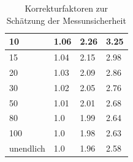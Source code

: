\documentclass[TGAI_Laborbericht.tex]{subfiles}
\begin{document}
\begin{table}[H]
\begin{tabular}{|l|l|l|l|}
10                                                             & 1.06                                                                & 2.26                                                             & 3.25                                                             \\ \hline
15                                                             & 1.04                                                                & 2.15                                                             & 2.98                                                             \\ \hline
20                                                             & 1.03                                                                & 2.09                                                             & 2.86                                                             \\ \hline
30                                                             & 1.02                                                                & 2.05                                                             & 2.76                                                             \\ \hline
50                                                             & 1.01                                                                & 2.01                                                             & 2.68                                                             \\ \hline
80                                                             & 1.0                                                                 & 1.99                                                             & 2.64                                                             \\ \hline
100                                                            & 1.0                                                                 & 1.98                                                             & 2.63                                                             \\ \hline
unendlich                                                      & 1.0                                                                 & 1.96                                                             & 2.58                                                             \\ \hline
\end{tabular}
\caption{Korrekturfaktoren zur Schätzung der Messunsicherheit\cite[S.10]{Franz2015b}}
\label{tab:KORREKTURFAKTUREN}
\end{table}
\end{document}
